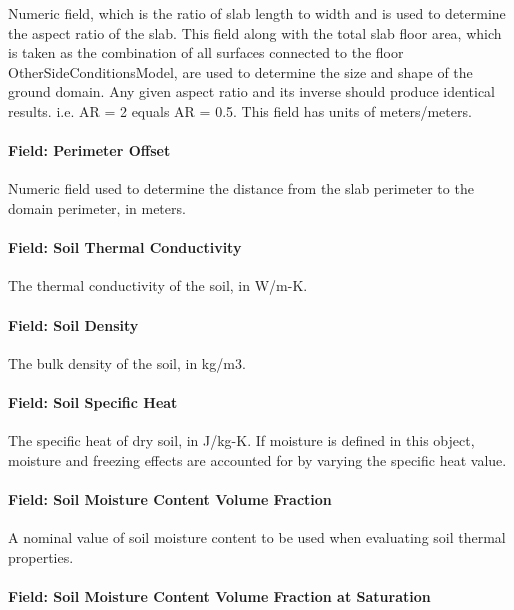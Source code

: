 Numeric field, which is the ratio of slab length to width and is used to determine the aspect ratio of the slab. This field along with the total slab floor area, which is taken as the combination of all surfaces connected to the floor OtherSideConditionsModel, are used to determine the size and shape of the ground domain. Any given aspect ratio and its inverse should produce identical results. i.e. AR = 2 equals AR = 0.5. This field has units of meters/meters.

\paragraph{Field: Perimeter Offset}\label{field-perimeter-offset}

Numeric field used to determine the distance from the slab perimeter to the domain perimeter, in meters.

\paragraph{Field: Soil Thermal Conductivity}\label{field-soil-thermal-conductivity-3}

The thermal conductivity of the soil, in W/m-K.

\paragraph{Field: Soil Density}\label{field-soil-density-3}

The bulk density of the soil, in kg/m3.

\paragraph{Field: Soil Specific Heat}\label{field-soil-specific-heat-3}

The specific heat of dry soil, in J/kg-K. If moisture is defined in this object, moisture and freezing effects are accounted for by varying the specific heat value.

\paragraph{Field: Soil Moisture Content Volume Fraction}\label{field-soil-moisture-content-volume-fraction-1}

A nominal value of soil moisture content to be used when evaluating soil thermal properties.

\paragraph{Field: Soil Moisture Content Volume Fraction at Saturation}\label{field-soil-moisture-content-volume-fraction-at-saturation-1}

